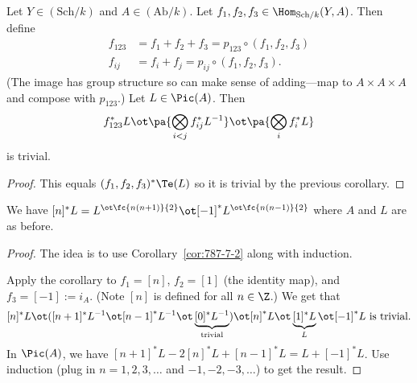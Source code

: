 \begin{cor}
Let $Y\in (\text{Sch}/k)$ and $A\in (\text{Ab}/k)$. Let $f_1,f_2,f_3\in \Hom_{\text{Sch}/k}(Y,A)$. Then define
\begin{align*}
f_{123}&=f_1+f_2+f_3=p_{123}\circ (f_1,f_2,f_3)\\
f_{ij} & =f_i+f_j=p_{ij}\circ (f_1,f_2,f_3).
\end{align*}
(The image has group structure so can make sense of adding---map to $A\times A\times A$ and compose with $p_{123}$.) Let $L\in \Pic(A)$. 
Then 
\[f_{123}^*L \ot \pa{\bigotimes_{i<j} f_{ij}^*L^{-1}}\ot \pa{\bigotimes_i f_i^* L}
\]
is trivial. 
\end{cor}
\begin{proof}
This equals $(f_1,f_2,f_3)^*\Te(L)$ so it is trivial by the previous corollary. %
\end{proof}

\begin{cor}
We have $[n]^* L=L^{\ot\fc{n(n+1)}{2}}\ot [-1]^* L^{\ot \fc{n(n-1)}{2}}$ where $A$ and $L$ are as before. 
\end{cor}
\begin{proof}
The idea is to use Corollary~\ref{cor:787-7-2} along with induction.

Apply the corollary to $f_1=[n]$, $f_2=[1]$ (the identity map), and $f_3=[-1]:=i_A$. (Note $[n]$ is defined for all $n\in \Z$.) We get that
\[
[n]^*L\ot ([n+1]^* L^{-1} \ot [n-1]^*L^{-1} \ot \underbrace{[0]^*L^{-1}}_{\text{trivial}}) \ot [n]^* L\ot \underbrace{[1]^*L}_{L} \ot [-1]^* L \text{ is trivial.}
\]
In $\Pic(A)$, we have $[n+1]^*L-2[n]^* L+[n-1]^*L=L+[-1]^* L$. Use induction (plug in $n=1,2,3,\ldots$ and $-1,-2,-3,\ldots$) to get the result.
\end{proof}